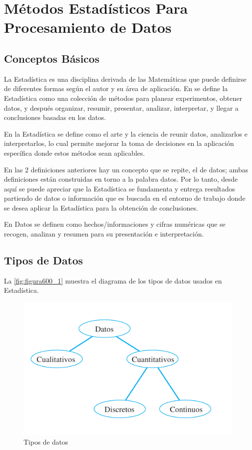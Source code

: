 \chapter{Métodos Estadísticos Para Procesamiento de Datos}
\label{ch:Estadisticos}

\section{Conceptos Básicos}

La Estadística es una disciplina derivada de las Matemáticas que puede definirse de diferentes formas según el autor y su área de aplicación. En \cite{triola} se define la Estadística como una colección de métodos para planear 
experimentos, obtener datos, y después organizar, resumir, presentar, analizar, interpretar, y llegar a conclusiones basadas en los datos.    

En \cite{anderson} la Estadística se define como el arte y la ciencia de reunir datos, analizarlos e interpretarlos, lo cual permite mejorar la toma de decisiones en la aplicación específica donde estos métodos sean aplicables.

En las 2 definiciones anteriores hay un concepto que se repite, el de datos; ambas definiciones están construidas en torno a la palabra datos. Por lo tanto, desde aquí se puede apreciar que la Estadística se fundamenta y 
entrega resultados partiendo de datos o información que es buscada en el entorno de trabajo donde se desea aplicar la Estadística para la obtención de conclusiones.

En \cite{anderson} Datos se definen como hechos/informaciones y cifras numéricas que se recogen, analizan y resumen para su presentación e interpretación. 

\clearpage

\section{Tipos de Datos}

La \autoref{fig:figura600_1} muestra el diagrama de los tipos de datos usados en Estadística.

\begin{figure}[h]
	\centering
	\includegraphics[scale=0.7]{imgss140.png}
	\caption{Tipos de datos}
	\label{fig:figura600_1}
\end{figure}

